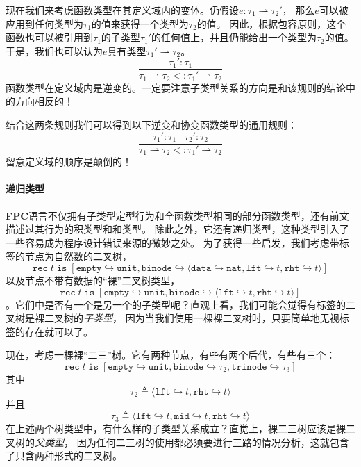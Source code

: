 现在我们来考虑函数类型在其定义域内的变体。仍假设$e:\tau_1 \rightharpoonup \tau_2{'}$，
那么$e$可以被应用到任何类型为$\tau_1$的值来获得一个类型为$\tau_2$的值。
因此，根据包容原则，这个函数也可以被引用到$\tau_1$的子类型$\tau_1{'}$的任何值上，并且仍能给出一个类型为$\tau_2$的值。
于是，我们也可以认为$e$具有类型$\tau_1{'} \rightharpoonup \tau_2$。
\begin{equation}
    \frac{\tau_1{'}:\tau_1}{\tau_1 \rightharpoonup \tau_2<:\tau_1{'} \rightharpoonup \tau_2}
\end{equation}
函数类型在定义域内是逆变的。一定要注意子类型关系的方向是和该规则的结论中的方向相反的！

结合这两条规则我们可以得到以下逆变和协变函数类型的通用规则：
\begin{equation}
    \frac{\tau_1{'}:\tau_1\;\;\;\tau_2{'}:\tau_2}{\tau_1 \rightharpoonup \tau_2<:\tau_1{'} \rightharpoonup \tau_2}
\end{equation}
留意定义域的顺序是颠倒的！

\paragraph{递归类型}
\textbf{FPC}语言不仅拥有子类型定型行为和全函数类型相同的部分函数类型，还有前文描述过其行为的积类型和和类型。
除此之外，它还有递归类型，这种类型引入了一些容易成为程序设计错误来源的微妙之处。
为了获得一些启发，我们考虑带标签的节点为自然数的二叉树，
$$
    \texttt{rec}\;t\;\texttt{is}\;[\texttt{empty} \hookrightarrow \texttt{unit},\texttt{binode} \hookrightarrow 
    \langle \texttt{data} \hookrightarrow \texttt{nat},\texttt{lft} \hookrightarrow t, \texttt{rht} \hookrightarrow t \rangle ] 
$$
以及节点不带有数据的“裸”二叉树类型，
$$
    \texttt{rec}\;t\;\texttt{is}\;[\texttt{empty} \hookrightarrow \texttt{unit},\texttt{binode} \hookrightarrow 
    \langle \texttt{lft} \hookrightarrow t, \texttt{rht} \hookrightarrow t \rangle ] 
$$
。它们中是否有一个是另一个的子类型呢？直观上看，我们可能会觉得有标签的二叉树是裸二叉树的\textit{子类型}，
因为当我们使用一棵裸二叉树时，只要简单地无视标签的存在就可以了。

现在，考虑一棵裸“二三”树。它有两种节点，有些有两个后代，有些有三个：
$$
    \texttt{rec}\;t\;\texttt{is}\;[\texttt{empty} \hookrightarrow \texttt{unit},\texttt{binode} \hookrightarrow 
    \tau_2,\texttt{trinode} \hookrightarrow \tau_3] 
$$
其中
$$
    \tau_2 \triangleq \langle \texttt{lft} \hookrightarrow t,\texttt{rht} \hookrightarrow t \rangle
$$
并且
$$
    \tau_3 \triangleq \langle \texttt{lft} \hookrightarrow t,\texttt{mid} \hookrightarrow t,\texttt{rht} \hookrightarrow t \rangle
$$
在上述两个树类型中，有什么样的子类型关系成立？直觉上，裸二三树应该是裸二叉树的\textit{父类型}，
因为任何二三树的使用都必须要进行三路的情况分析，这就包含了只含两种形式的二叉树。

